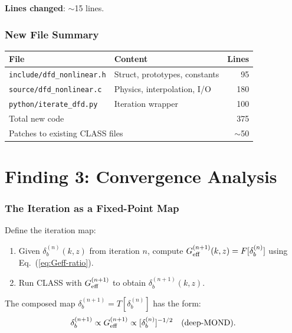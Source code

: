 \documentclass[11pt]{article}
\theoremstyle{definition}
\theoremstyle{remark}
\newcommand{\Geff}{G_{\rm eff}}
\begin{document}
\textbf{Lines changed}: $\sim$15 lines.


\section{New File Summary}

\begin{center}
\begin{tabular}{llr}
\toprule
File & Content & Lines \\
\midrule
\texttt{include/dfd\_nonlinear.h} & Struct, prototypes, constants & 95 \\
\texttt{source/dfd\_nonlinear.c} & Physics, interpolation, I/O & 180 \\
\texttt{python/iterate\_dfd.py} & Iteration wrapper & 100 \\
\midrule
\multicolumn{2}{l}{Total new code} & 375 \\
\multicolumn{2}{l}{Patches to existing CLASS files} & $\sim$50 \\
\bottomrule
\end{tabular}
\end{center}


\part{Finding 3: Convergence Analysis}
\label{part:convergence}

\section{The Iteration as a Fixed-Point Map}
\label{sec:convergence}

Define the iteration map:
\begin{enumerate}
\item Given $\delta_b^{(n)}(k,z)$ from iteration $n$, compute
  $\Geff^{(n+1)}(k,z) = F[\delta_b^{(n)}]$ using Eq.~(\ref{eq:Geff-ratio}).
\item Run CLASS with $\Geff^{(n+1)}$ to obtain $\delta_b^{(n+1)}(k,z)$.
\end{enumerate}

The composed map $\delta_b^{(n+1)} = T[\delta_b^{(n)}]$ has the form:
\begin{equation}
\delta_b^{(n+1)} \propto \Geff^{(n+1)} \propto [\delta_b^{(n)}]^{-1/2}
\quad\text{(deep-MOND)}.
\end{equation}
\end{document}
